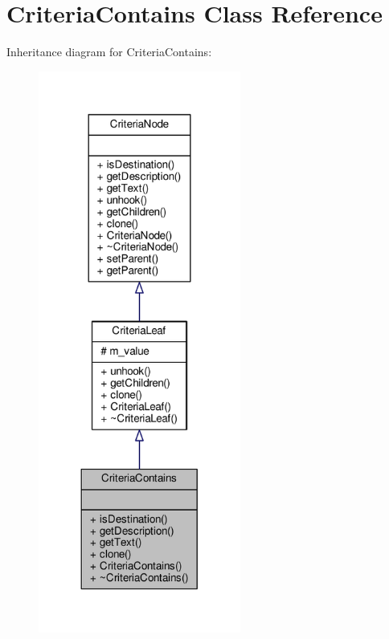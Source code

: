 \hypertarget{classCriteriaContains}{}\section{Criteria\+Contains Class Reference}
\label{classCriteriaContains}


Inheritance diagram for Criteria\+Contains\+:
\nopagebreak
\begin{figure}[H]
\begin{center}
\leavevmode
\includegraphics[width=188pt]{d8/d38/classCriteriaContains__inherit__graph}
\end{center}
\end{figure}


